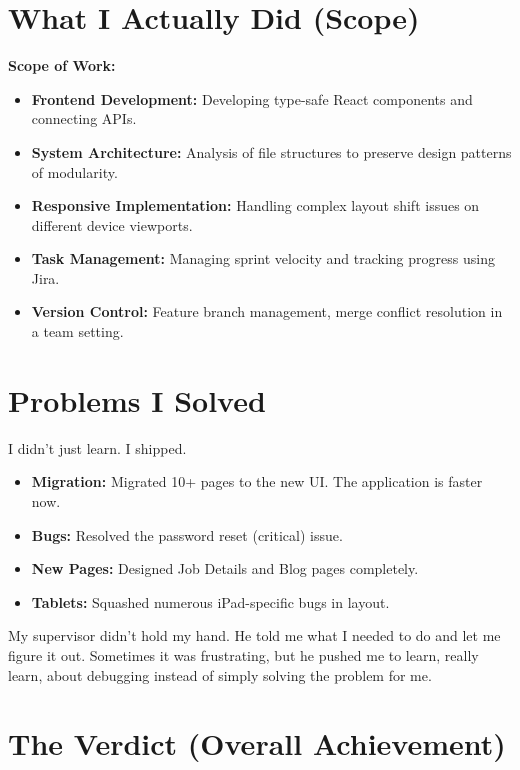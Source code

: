 \section{What I Actually Did (Scope)}

\par \textbf{Scope of Work:}
\begin{itemize}
    \item \textbf{Frontend Development:} Developing type-safe React components and connecting APIs.
    \item \textbf{System Architecture:} Analysis of file structures to preserve design patterns of modularity.
    \item \textbf{Responsive Implementation:} Handling complex layout shift issues on different device viewports.
    \item \textbf{Task Management:} Managing sprint velocity and tracking progress using Jira.
    \item \textbf{Version Control:} Feature branch management, merge conflict resolution in a team setting.
\end{itemize}

\section{Problems I Solved}

\par I didn't just learn. I shipped.
\begin{itemize}
    \item \textbf{Migration:} Migrated 10+ pages to the new UI. The application is faster now.
    \item \textbf{Bugs:} Resolved the password reset (critical) issue.
    \item \textbf{New Pages:} Designed Job Details and Blog pages completely.
    \item \textbf{Tablets:} Squashed numerous iPad-specific bugs in layout.
\end{itemize}

\par My supervisor didn’t hold my hand. He told me what I needed to do and let me figure it out. Sometimes it was frustrating, but he pushed me to learn, really learn, about debugging instead of simply solving the problem for me.

\section{The Verdict (Overall Achievement)}

